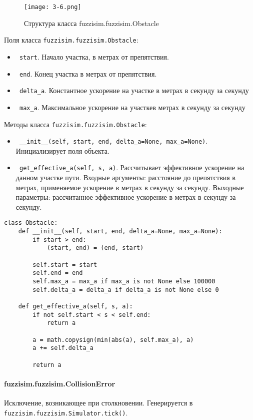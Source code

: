\begin{figure}[ht]
	\centering
	\texttt{[image: 3-6.png]}
	\caption{ Структура класса fuzzisim.fuzzisim.Obstacle}
\end{figure}

Поля класса \lstinline!fuzzisim.fuzzisim.Obstacle!:
\begin{itemize}
	\item \lstinline! start!. Начало участка, в метрах от препятствия.
	\item \lstinline! end!. Конец участка в метрах от препятствия.
	\item \lstinline! delta_a!. Константное ускорение на участке в метрах в секунду за секунду
	\item \lstinline! max_a!.  Максимальное ускорение на участкев метрах в секунду за секунду
\end{itemize}

Методы класса \lstinline!fuzzisim.fuzzisim.Obstacle!:
\begin{itemize}
	\item \lstinline! __init__(self, start, end, delta_a=None, max_a=None)!. Инициализирует поля объекта.
	\item \lstinline! get_effective_a(self, s, a)!.  Рассчитывает эффективное ускорение на данном участке пути. Входные аргументы: расстояние до препятствия в метрах, применяемое ускорение в метрах в секунду за секунду. Выходные параметры: рассчитанное эффективное ускорение в метрах в секунду за секунду.
\end{itemize}

\begin{lstlisting}[style=pythonstyle,caption={  }, label=lst:func:1]
class Obstacle:
	def __init__(self, start, end, delta_a=None, max_a=None):
		if start > end:
			(start, end) = (end, start)

		self.start = start
		self.end = end
		self.max_a = max_a if max_a is not None else 100000
		self.delta_a = delta_a if delta_a is not None else 0

	def get_effective_a(self, s, a):
		if not self.start < s < self.end:
			return a

		a = math.copysign(min(abs(a), self.max_a), a)
		a += self.delta_a

		return a
\end{lstlisting}




\paragraph{fuzzisim.fuzzisim.CollisionError}
Исключение, возникающее при столкновении. Генерируется в \lstinline!fuzzisim.fuzzisim.Simulator.tick()!.


